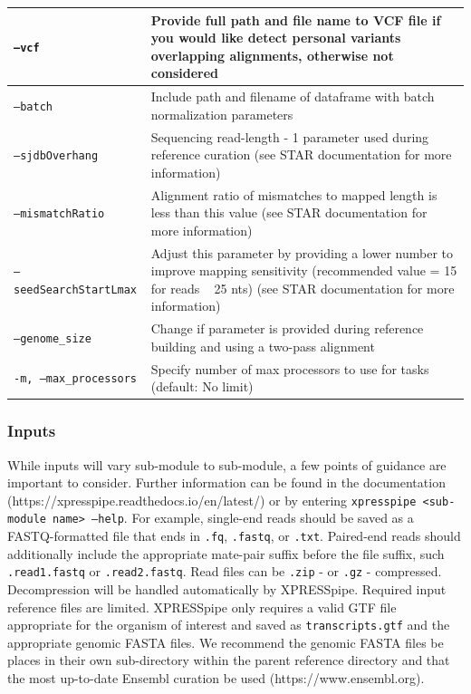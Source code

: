 \documentclass[11pt, a4paper, oneside]{article}
\begin{document}
\begin{tabular}{p{5cm}p{13cm}}
 \hline
 \texttt{--vcf} & Provide full path and file name to VCF file if you would like detect personal variants overlapping alignments, otherwise not considered \\
 \hline
 \texttt{--batch} & Include path and filename of dataframe with batch normalization parameters \\
 \hline
 \texttt{--sjdbOverhang} & Sequencing read-length - 1 parameter used during reference curation (see STAR documentation for more information) \\
 \hline
 \texttt{--mismatchRatio} & Alignment ratio of mismatches to mapped length is less than this value (see STAR documentation for more information) \\
 \hline
 \texttt{--seedSearchStartLmax} & Adjust this parameter by providing a lower number to improve mapping sensitivity (recommended value = 15 for reads ~ 25 nts) (see STAR documentation for more information) \\
 \hline
 \texttt{--genome\_size} & Change if parameter is provided during reference building and using a two-pass alignment \\
 \hline
 \texttt{-m, --max\_processors} & Specify number of max processors to use for tasks (default: No limit) \\
\end{tabular}
\newline


\subsubsection{Inputs}
While inputs will vary sub-module to sub-module, a few points of guidance are important to consider. Further information can be found in the documentation (https://xpresspipe.readthedocs.io/en/latest/) or by entering \texttt{xpresspipe \textless sub-module name\textgreater \ --help}. For example, single-end reads should be saved as a FASTQ-formatted file that ends in \texttt{.fq}, \texttt{.fastq}, or \texttt{.txt}. Paired-end reads should additionally include the appropriate mate-pair suffix before the file suffix, such \texttt{.read1.fastq} or \texttt{.read2.fastq}. Read files can be \texttt{.zip} - or \texttt{.gz} - compressed. Decompression will be handled automatically by XPRESSpipe. Required input reference files are limited. XPRESSpipe only requires a valid GTF file appropriate for the organism of interest and saved as \texttt{transcripts.gtf} and the appropriate genomic FASTA files. We recommend the genomic FASTA files be places in their own sub-directory within the parent reference directory and that the most up-to-date Ensembl curation be used (https://www.ensembl.org).
\end{document}
